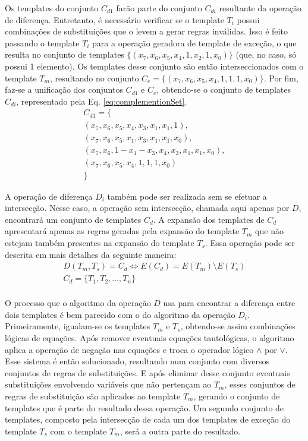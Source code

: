 Os templates do conjunto $C_{d1}$ farão parte do conjunto $C_{di}$ resultante da operação de diferença. Entretanto, é necessário verificar se o template $T_i$ possui combinações de substituições que o levem a gerar regras inválidas. Isso é feito passando o template $T_i$ para a operação geradora de template de exceção, o que resulta no conjunto de templates $\{(x_7, x_6, x_5, x_4, 1, x_2, 1, x_0)\}$ (que, no caso, só possui 1 elemento). Os templates desse conjunto são então interseccionados com o template $T_m$, resultando no conjunto $C_e = \{(x_7, x_6, x_5, x_4, 1, 1, 1, x_0)\}$. Por fim, faz-se a unificação dos conjuntos $C_{d1}$ e $C_e$, obtendo-se o conjunto de templates $C_{di}$, representado pela Eq. \ref{eq:complementionSet}.
\begin{equation}
\begin{split}
C_{d1} = \{\\(x_7, x_6, x_5, x_4, x_3, x_1, x_1, 1), \\(x_7, x_6, x_5, x_1, x_3, x_1, x_1, x_0), \\(x_7, x_6, 1 - x_1 - x_3, x_4, x_3, x_1, x_1, x_0), \\(x_7, x_6, x_5, x_4, 1, 1, 1, x_0)\\\}
\label{eq:complementionSet}
\end{split}
\end{equation}

A operação de diferença $D_i$ também pode ser realizada sem se efetuar a intersecção. Nesse caso, a operação sem intersecção, chamada aqui apenas por $D$, encontrará um conjunto de templates $C_d$. A expansão dos templates de $C_{d}$ apresentará apenas as regras geradas pela expansão do template $T_m$ que não estejam também presentes na expansão do template $T_s$. Essa operação pode ser descrita em mais detalhes da seguinte maneira:
\begin{equation}
\begin{split}
D(T_m,T_s)= C_d \Leftrightarrow E(C_d) = E(T_m) \setminus E(T_s) \\
C_d = \{T_1,T_2,\dots, T_n\}\\
\end{split}
\end{equation}

O processo que o algoritmo da operação $D$ usa para encontrar a diferença entre dois templates é bem parecido com o do algoritmo da operação $D_{i}$. Primeiramente, igualam-se os templates $T_m$ e $T_s$, obtendo-se assim combinações lógicas de equações. Após remover eventuais equações tautológicas, o algoritmo aplica a operação de negação nas equações e troca o operador lógico $\wedge$ por $\vee$. Esse sistema é então solucionado, resultando num conjunto com diversos conjuntos de regras de substituições. E após eliminar desse conjunto eventuais substituições envolvendo variáveis que não pertençam ao $T_m$, esses conjuntos de regras de substituição são aplicados ao template $T_m$, gerando o conjunto de templates que é parte do resultado dessa operação. Um segundo conjunto de templates, composto pela intersecção de cada um dos templates de exceção do template $T_s$ com o template $T_m$, será a outra parte do resultado.

